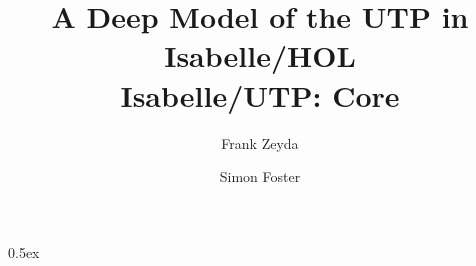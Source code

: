 \documentclass[11pt,a4paper]{article}
\begin{document}
\title{A Deep Model of the UTP in Isabelle/HOL \\ Isabelle/UTP: Core}

\author{Frank Zeyda \and Simon Foster}

\maketitle

\tableofcontents

\parindent 0pt\parskip 0.5ex

%

\newpage



\newpage



\newpage



\newpage



\newpage

%

\newpage



\newpage



\newpage



\newpage



\newpage



\newpage



\newpage



\newpage




\newpage

% 


% 


% 


% 
\end{document}
